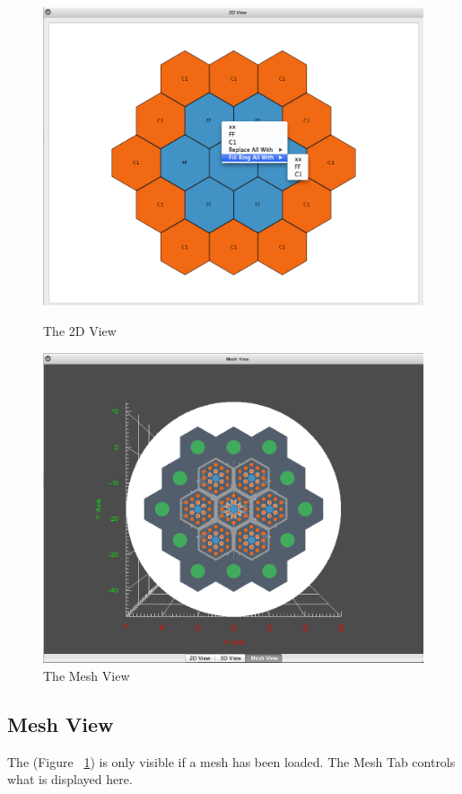 \begin{figure}[hbt]
\centering
\begin{minipage}{.45\textwidth}
  \centering
	\includegraphics[width=0.9\linewidth]{Images/2DView.png}
	\caption{The 2D View}
	\label{fig:2DView}
\end{minipage}%
\begin{minipage}{.45\textwidth}
  \centering
	\includegraphics[width=0.87\linewidth]{Images/MeshView.png}
	\caption{The Mesh View}
	\label{fig:MeshView}
\end{minipage}
\end{figure}

\subsection{Mesh View}
The  (Figure ~\ref{fig:MeshView}) is only visible if a mesh has been loaded.  The Mesh Tab controls what is displayed here.
